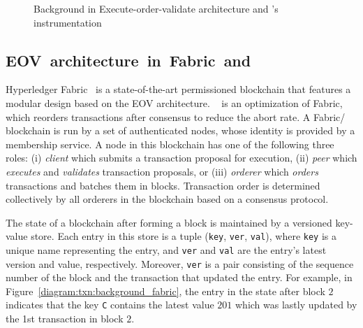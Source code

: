 \begin{figure}[h!]
\begin{subfigure}{0.28\textwidth}
      \caption{}
      \label{diagram:txn:background_orderer}
    \end{subfigure}
    \caption{Background in Execute-order-validate architecture and {\fabricPlusplus}'s instrumentation}
    \label{diagram:txn:background}
\end{figure}

\subsection{EOV~architecture~in~Fabric~and~{\fabricPlusplus}}
\label{sec:txn:background_fabric}

Hyperledger Fabric~\cite{androulaki2018hyperledger} is a state-of-the-art
permissioned blockchain that features a modular design based on the EOV architecture.
%
{\fabricPlusplus}~\cite{sharma2019blurring} is an optimization of Fabric, which reorders transactions after consensus to reduce the abort rate.
%
A Fabric/{\fabricPlusplus} blockchain is run by a set of authenticated nodes, whose identity is
provided by a membership service.
%
A node in this blockchain has one of the following three roles:
%
(i) \textit{client} which submits a transaction proposal for execution,
%
(ii) \textit{peer} which \textit{executes} and \textit{validates}
transaction proposals,
%
or (iii) \textit{orderer} which \textit{orders} transactions and batches
them in blocks.
%
Transaction order is determined collectively by all orderers in
the blockchain based on a consensus protocol.
%

The state of a blockchain after forming a block is maintained by a
versioned key-value store.
% 
Each entry in this store is a tuple (\texttt{key}, \texttt{ver},
\texttt{val}), where \texttt{key} is a unique name representing the entry, and
\texttt{ver} and \texttt{val} are the entry's latest version and value, respectively.
% 
Moreover, \texttt{ver} is a pair consisting of the sequence number of the block
and the transaction that updated the entry.
%
For example, in Figure~\ref{diagram:txn:background_fabric}, the entry  in
the state after block $2$ indicates that the key \texttt{C} contains the latest
value $201$ which was lastly updated by the 1st transaction in block $2$.

